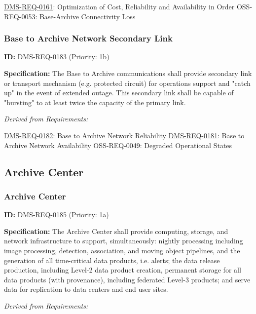 \documentclass[SE,toc,lsstdraft]{lsstdoc}
\begin{document}
\hyperref[DMS-REQ-0161]{DMS-REQ-0161}:
Optimization of Cost, Reliability and Availability in Order \newline
OSS-REQ-0053:
Base-Archive Connectivity Loss \newline

\subsubsection{Base to Archive Network Secondary Link}

\label{DMS-REQ-0183}
\textbf{ID:} DMS-REQ-0183 (Priority: 1b)

\textbf{Specification: }The Base to Archive communications shall provide secondary link or transport mechanism (e.g. protected circuit) for operations support and "catch up"  in the event of extended outage.  This secondary link shall be capable of "bursting" to at least twice the capacity of the primary link.

\emph{Derived from Requirements:}

\hyperref[DMS-REQ-0182]{DMS-REQ-0182}:
Base to Archive Network Reliability \newline
\hyperref[DMS-REQ-0181]{DMS-REQ-0181}:
Base to Archive Network Availability \newline
OSS-REQ-0049:
Degraded Operational States \newline

\subsection{Archive Center}

\subsubsection{Archive Center}

\label{DMS-REQ-0185}
\textbf{ID:} DMS-REQ-0185 (Priority: 1a)

\textbf{Specification:} The Archive Center shall provide computing, storage, and network infrastructure to support, simultaneously: nightly processing including image processing, detection, association, and moving object pipelines, and the generation of all time-critical data products, i.e. alerts; the data release production, including Level-2 data product creation, permanent storage for all data products (with provenance), including federated Level-3 products; and serve data for replication to data centers and end user sites.

\emph{Derived from Requirements:}
\end{document}
